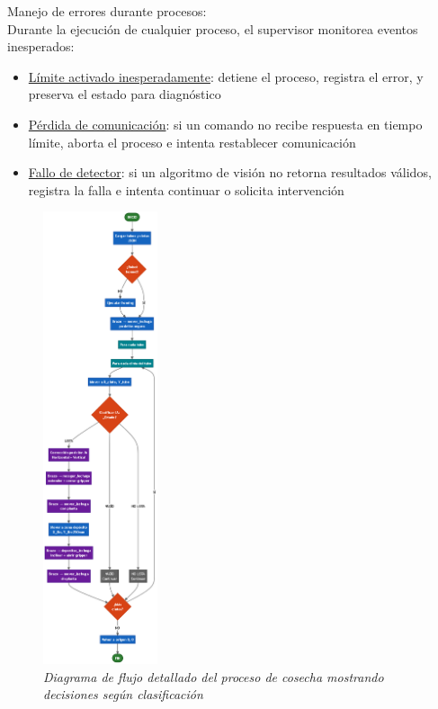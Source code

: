 Manejo de errores durante procesos:\\
Durante la ejecución de cualquier proceso, el supervisor monitorea eventos inesperados:

\begin{itemize}[label=$\bullet$]
    \item \underline{Límite activado inesperadamente}: detiene el proceso, registra el error, y preserva el estado para diagnóstico
    \item \underline{Pérdida de comunicación}: si un comando no recibe respuesta en tiempo límite, aborta el proceso e intenta restablecer comunicación
    \item \underline{Fallo de detector}: si un algoritmo de visión no retorna resultados válidos, registra la falla e intenta continuar o solicita intervención
\end{itemize}

\begin{figure}[H]
    \centering
    \includegraphics[width=0.3\textwidth]{imagenes/diagrama_flujo_cosecha.png}
    \caption{\textit{Diagrama de flujo detallado del proceso de cosecha mostrando decisiones según clasificación}}
    \label{fig:flujo_cosecha}
\end{figure}
